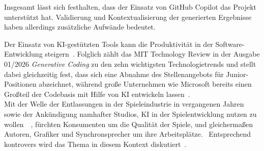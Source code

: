 Insgesamt lässt sich festhalten, dass der Einsatz von GitHub Copilot das Projekt unterstützt hat.
Validierung und Kontextualisierung der generierten Ergebnisse haben allerdings zusätzliche Aufwände bedeutet.

\vspace{5mm}
\begin{tcolorbox}[title={Die Spieleindustrie und der Einsatz von KI}, colback=black!5, colframe=black]
    Der Einsatz von KI-gestützten Tools kann die Produktivität in der Software-Entwicklung steigern~\cite{githubProductivity}.
    Folglich zählt das MIT Technology Review in der Ausgabe 01/2026 \textit{Generative Coding} zu den zehn wichtigsten Technologietrends und stellt dabei gleichzeitig fest, dass sich eine Abnahme des Stellenangebots für Junior-Positionen abzeichnet, während große Unternehmen wie Microsoft bereits einen Großteil der Codebasis mit Hilfe von KI entwickeln lassen~\cite{heiseAi}.\\

    Mit der Welle der Entlassungen in der Spieleindustrie in vergangenen Jahren~\cite{gamesindustryLayoffs} sowie der Ankündigung namhafter Studios, KI in der Spielentwicklung nutzen zu wollen~\cite{larianAi}~\cite{ubisoftAi}, fürchten Konsumenten um die Qualität der Spiele, und gleichermaßen Autoren, Grafiker und Synchronsprecher um ihre Arbeitsplätze.~\cite[S. 22]{Soti2026}
    Entsprechend kontrovers wird das Thema in diesem Kontext diskutiert~\cite{pcgameraAi}.
\end{tcolorbox}
\vspace{5mm}